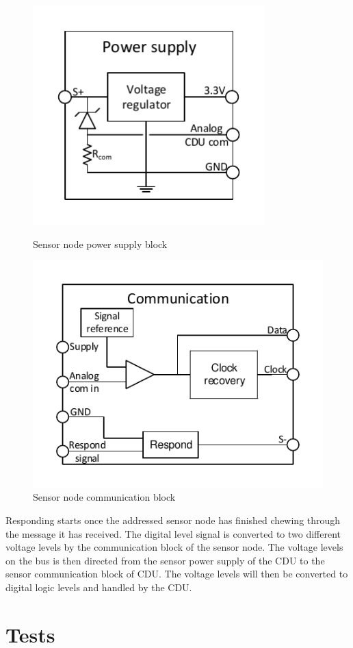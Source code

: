 \begin{figure}[H]
	\begin{minipage}[b]{0.45\linewidth}
	\centering
	\includegraphics[width=0.8\textwidth]{billeder/11ProjectDescription/powersupply_detailed_sn}
	\caption{Sensor node power supply block}
	\label{fig:SN_PS_FIGURE}
	\end{minipage}
	\begin{minipage}[b]{0.45\linewidth}
	\centering
	\includegraphics[width=1\textwidth]{billeder/11ProjectDescription/communication_sn}
	\caption{Sensor node communication block}
	\label{fig:SN_com_fig}
	\end{minipage}
\end{figure} 
Responding starts once the addressed sensor node has finished chewing through the message it has received. The digital level signal is converted to two different voltage levels by the communication block of the sensor node. The voltage levels on the bus is then directed from the sensor power supply of the CDU to the sensor communication block of CDU. The voltage levels will then be converted to digital logic levels and handled by the CDU.

\section{Tests}
